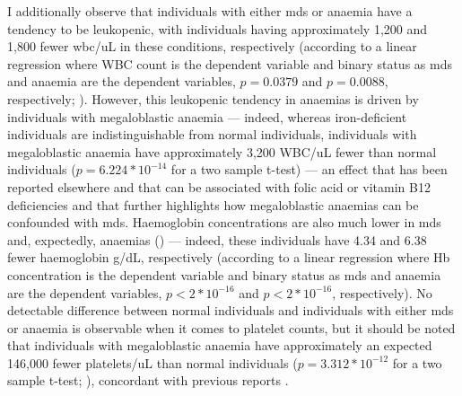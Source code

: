I additionally observe that individuals with either \ac{mds} or anaemia have a tendency to be leukopenic, with individuals having approximately 1,200 and 1,800 fewer \ac{wbc}/uL in these conditions, respectively (according to a linear regression where WBC count is the dependent variable and binary status as \ac{mds} and anaemia are the dependent variables, $p=0.0379$ and $p=0.0088$, respectively; ). However, this leukopenic tendency in anaemias is driven by individuals with megaloblastic anaemia --- indeed, whereas iron-deficient individuals are indistinguishable from normal individuals, individuals with megaloblastic anaemia have approximately 3,200 WBC/uL fewer than normal individuals ($p=6.224*10^{-14}$ for a two sample t-test) --- an effect that has been reported elsewhere and that can be associated with folic acid or vitamin B12 deficiencies \cite{Kaferle2009-pl,Castle1978-ky} and that further highlights how megaloblastic anaemias can be confounded with \ac{mds}. Haemoglobin concentrations are also much lower in \ac{mds} and, expectedly, anaemias () --- indeed, these individuals have 4.34 and 6.38 fewer haemoglobin g/dL, respectively (according to a linear regression where Hb concentration is the dependent variable and binary status as \ac{mds} and anaemia are the dependent variables, $p<2*10^{-16}$ and $p<2*10^{-16}$, respectively). No detectable difference between normal individuals and individuals with either \ac{mds} or anaemia is observable when it comes to platelet counts, but it should be noted that individuals with megaloblastic anaemia have approximately an expected 146,000 fewer platelets/uL than normal individuals ($p=3.312*10^{-12}$ for a two sample t-test; ), concordant with previous reports \cite{Castle1978-ky}. 

\begin{figure}[!ht]
    \label{fig:mds-wbcc}
\end{figure}

\begin{figure}[!ht]
    \label{fig:mds-hb}
\end{figure}

\begin{figure}[!ht]
    \label{fig:mds-plt}
\end{figure}

